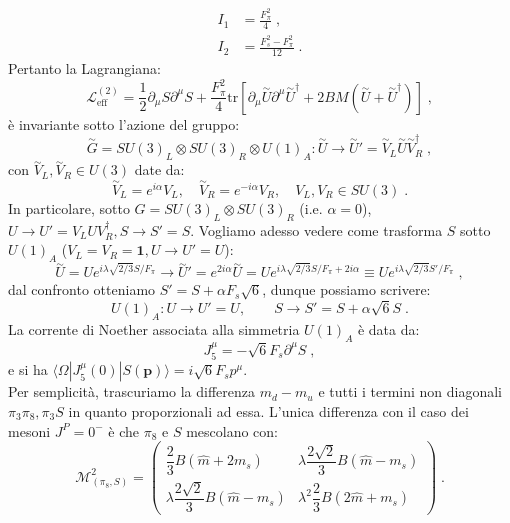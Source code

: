 \documentclass[12pt,a4paper]{article}
\theoremstyle{definition}
\newcommand{\lag}{\mathcal{L}}
\newcommand{\bra}{\langle}
\newcommand{\ket}{\rangle}
\newcommand{\adj}[1]{#1^{\dagger}}
\newcommand{\tr}{\mathrm{tr}}
\numberwithin{equation}{section}
\begin{document}
\begin{align*}
I_1 &= \frac{F_{\pi}^2}{4}\;, \\
I_2 &= \frac{F_s^2-F_{\pi}^2}{12}\;.
\end{align*}
Pertanto la Lagrangiana:
\begin{equation}
\boxed{
\lag_{\mathrm{eff}}^{(2)}=\frac{1}{2}\partial_{\mu}S\partial^{\mu}S+\frac{F_{\pi}^2}{4}\tr\left[\partial_{\mu}\stackrel{\sim}{U}\partial^{\mu}\adj{\stackrel{\sim}{U}}+2BM(\stackrel{\sim}{U}+\adj{\stackrel{\sim}{U}})\right]
}\;,
\end{equation}
è invariante sotto l'azione del gruppo:
$$
\stackrel{\sim}{G}=SU(3)_L\otimes SU(3)_R\otimes U(1)_A: \stackrel{\sim}{U}\to\stackrel{\sim}{U}'=\stackrel{\sim}{V}_L\stackrel{\sim}{U}\adj{\stackrel{\sim}{V}_R}\;,
$$
con $\stackrel{\sim}{V}_L,\stackrel{\sim}{V}_R\in U(3)$ date da:
\begin{equation}
\stackrel{\sim}{V}_L=e^{i\alpha}V_L,\quad \stackrel{\sim}{V}_R=e^{-i\alpha}V_R,\quad V_L,V_R\in SU(3)\;.
\end{equation}
In particolare, sotto $G=SU(3)_L\otimes SU(3)_R$ (i.e. $\alpha=0$), $U\to U'=V_LU\adj{V}_R, S\to S'=S$. Vogliamo adesso vedere come trasforma $S$ sotto $U(1)_A$ ($V_L=V_R=\mathbf{1}, U\to U'=U$):
$$
\stackrel{\sim}{U}=Ue^{i\lambda\sqrt{2/3}S/F_{\pi}}\to \stackrel{\sim}{U}'=e^{2i\alpha}\stackrel{\sim}{U}=Ue^{i\lambda\sqrt{2/3}S/F_{\pi}+2i\alpha}\equiv Ue^{i\lambda\sqrt{2/3}S'/F_{\pi}}\;,
$$
dal confronto otteniamo $S'=S+\alpha F_s\sqrt{6}$, dunque possiamo scrivere:
\begin{equation}
U(1)_A: U\to U'=U,\qquad S\to S'=S+\alpha\sqrt{6}S\;.
\end{equation}
La corrente di Noether associata alla simmetria $U(1)_A$ è data da:
\begin{equation}
J^{\mu}_5=-\sqrt{6}F_s\partial^{\mu}S\;,
\end{equation}
e si ha $\bra\Omega|J^{\mu}_5(0)|S(\mathbf{p})\ket=i\sqrt{6}F_sp^{\mu}$. \\
Per semplicità, trascuriamo la differenza $m_d-m_u$ e tutti i termini non diagonali $\pi_3\pi_8,\pi_3S$ in quanto proporzionali ad essa. L'unica differenza con il caso dei mesoni $J^P=0^-$ è che $\pi_8$ e $S$ mescolano con:
\begin{equation}
\mathcal{M}^2_{(\pi_8,S)}=\left(\begin{matrix}
\dfrac{2}{3}B(\hat{m}+2m_s) & \lambda\dfrac{2\sqrt{2}}{3}B(\hat{m}-m_s) \\
\lambda \dfrac{2\sqrt{2}}{3}B(\hat{m}-m_s) & \lambda^2\dfrac{2}{3}B(2\hat{m}+m_s)
\end{matrix}\right)\;.
\end{equation}
\end{document}
